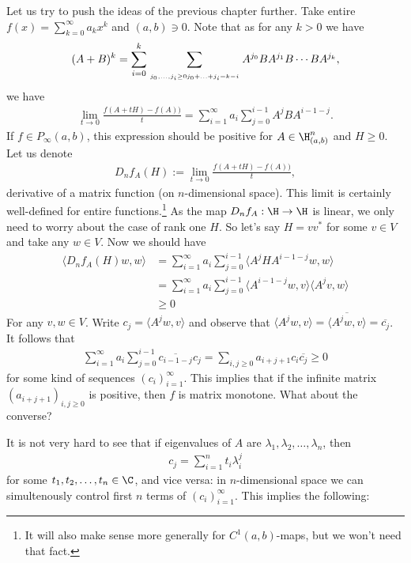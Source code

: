 Let us try to push the ideas of the previous chapter further. Take entire $f(x) = \sum_{k = 0}^{\infty} a_{k} x^{k}$ and $(a, b) \ni 0$. Note that as for any $k > 0$ we have
\begin{align*}
	(A + B)^k = \sum_{i = 0}^{k} \sum_{\atop{j_{0}, \ldots, j_{i} \geq 0}{j_{0} + \ldots + j_{i} = k - i}} A^{j_{0}} B A^{j_{1}} B \cdots B A^{j_{k}},
\end{align*}
we have
\begin{align*}
	\lim_{t \to 0} \frac{f(A + t H) - f(A))}{t} = \sum_{i = 1}^{\infty} a_{i} \sum_{j = 0}^{i - 1} A^{j} B A^{i - 1 - j}.
\end{align*}
If $f \in P_{\infty}(a, b)$, this expression should be positive for $A \in \H^{n}_{(a, b)}$ and $H \geq 0$. Let us denote
\begin{align*}
	D_{n} f_{A}(H) := \lim_{t \to 0} \frac{f(A + t H) - f(A))}{t},
\end{align*}
derivative of a matrix function (on $n$-dimensional space). This limit is certainly well-defined for entire functions.\footnote{It will also make sense more generally for $C^{1}(a, b)$-maps, but we won't need that fact.} As the map $D_{n} f_{A} : \H \to \H$ is linear, we only need to worry about the case of rank one $H$. So let's say $H = v v^{*}$ for some $v \in V$ and take any $w \in V$. Now we should have
\begin{align*}
	\langle D_{n} f_{A}(H) w, w \rangle &= \sum_{i = 1}^{\infty} a_{i} \sum_{j = 0}^{i - 1} \langle A^{j} H A^{i - 1 - j} w, w \rangle \\
	&= \sum_{i = 1}^{\infty} a_{i} \sum_{j = 0}^{i - 1} \langle  A^{i - 1 - j} w, v \rangle \langle A^{j} v, w \rangle \\
	&\geq 0
\end{align*}
For any $v, w \in V$. Write $c_{j} = \langle A^{j} w, v \rangle$ and observe that $\langle  A^{j} w, v \rangle = \overline{\langle A^{j} w, v \rangle} = \overline{c_{j}}$. It follows that
\begin{align*}
	\sum_{i = 1}^{\infty} a_{i} \sum_{j = 0}^{i - 1} \overline{c_{i - 1 - j}} c_{j} = \sum_{i, j \geq 0} a_{i + j + 1} c_{i} \overline{c_{j}} \geq 0
\end{align*}
for some kind of sequences $(c_{i})_{i = 1}^{\infty}$. This implies that if the infinite matrix $(a_{i + j + 1})_{i, j \geq 0}$ is positive, then $f$ is matrix monotone. What about the converse?

It is not very hard to see that if eigenvalues of $A$ are $\lambda_{1}, \lambda_{2}, \ldots, \lambda_{n}$, then
\begin{align*}
c_{j} = \sum_{i = 1}^{n} t_{i} \lambda_{i}^{j}
\end{align*}
for some $t_{1}, t_{2}, \ldots, t_{n} \in \C$, and vice versa: in $n$-dimensional space we can simultenously control first $n$ terms of $(c_{i})_{i = 1}^{\infty}$. This implies the following:

